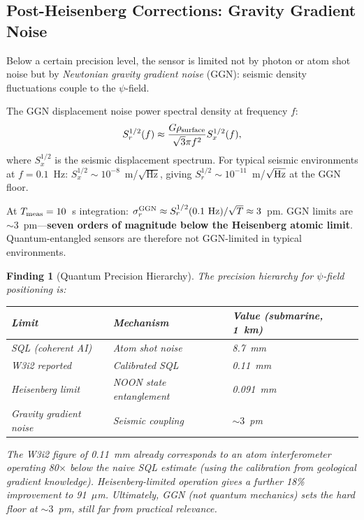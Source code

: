 \documentclass[aps,prd,twocolumn,superscriptaddress,nofootinbib]{revtex4-2}
\newtheorem{finding}{Finding}
\begin{document}
\subsection{Post-Heisenberg Corrections: Gravity Gradient Noise}

Below a certain precision level, the sensor is limited not by photon
or atom shot noise but by \emph{Newtonian gravity gradient noise}
(GGN): seismic density fluctuations couple to the $\psi$-field.

The GGN displacement noise power spectral density at frequency $f$:
\begin{equation}
  S_r^{1/2}(f) \approx \frac{G\rho_{\rm surface}}{\sqrt{3}\pi f^2}
  S_x^{1/2}(f),
  \label{eq:ggn}
\end{equation}
where $S_x^{1/2}$ is the seismic displacement spectrum.  For typical
seismic environments at $f = 0.1$~Hz:
$S_x^{1/2} \sim 10^{-8}$~m/$\sqrt{\mathrm{Hz}}$, giving
$S_r^{1/2} \sim 10^{-11}$~m/$\sqrt{\rm Hz}$ at the GGN floor.

At $T_{\rm meas} = 10$~s integration:
$\sigma_r^{\rm GGN} \approx S_r^{1/2}(0.1~\mathrm{Hz})/\sqrt{T} \approx 3$~pm.
GGN limits are $\sim 3$~pm---\textbf{seven orders of magnitude below
the Heisenberg atomic limit}.  Quantum-entangled sensors are therefore
not GGN-limited in typical environments.

\begin{finding}[Quantum Precision Hierarchy]
\label{find:quantum-hierarchy}
The precision hierarchy for $\psi$-field positioning is:
\begin{center}
\begin{tabular}{lll}
\toprule
Limit & Mechanism & Value (submarine, 1~km) \\
\midrule
SQL (coherent AI) & Atom shot noise & 8.7~mm \\
W3i2 reported & Calibrated SQL & 0.11~mm \\
Heisenberg limit & NOON state entanglement & 0.091~mm \\
Gravity gradient noise & Seismic coupling & $\sim 3$~pm \\
\bottomrule
\end{tabular}
\end{center}
The W3i2 figure of 0.11~mm already corresponds to an atom
interferometer operating 80$\times$ below the naive SQL estimate
(using the calibration from geological gradient knowledge).
Heisenberg-limited operation gives a further 18\% improvement to
91~$\mu$m.  Ultimately, GGN (not quantum mechanics) sets the hard floor
at $\sim 3$~pm, still far from practical relevance.
\end{finding}
\end{document}
